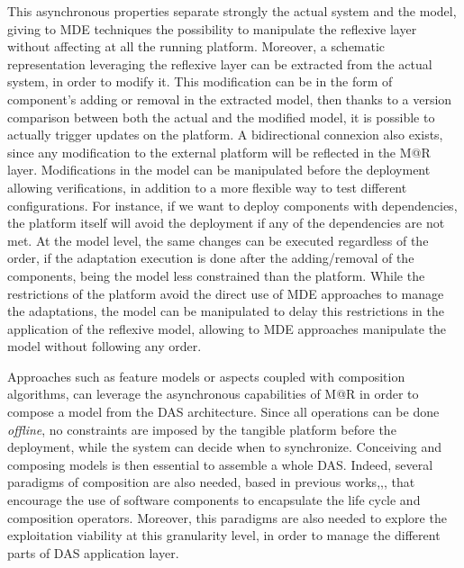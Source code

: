 This asynchronous properties separate strongly the actual system and the model, giving to MDE techniques the possibility to manipulate the reflexive layer without affecting at all the running platform.
Moreover, a schematic representation leveraging the reflexive layer can be extracted from the actual system, in order to modify it.
This modification can be in the form of component's adding or removal in the extracted model, then thanks to a version comparison between both the actual and the modified model, it is possible to actually trigger updates on the platform.
A bidirectional connexion also exists, since any modification to the external platform will be reflected in the M@R layer.
Modifications in the model can be manipulated before the deployment allowing verifications, in addition to a more flexible way to test different configurations.
For instance, if we want to deploy components with dependencies, the platform itself will avoid the deployment if any of the dependencies are not met.
At the model level, the same changes can be executed regardless of the order, if the adaptation execution is done after the adding/removal of the components, being the model less constrained than the platform.
While the restrictions of the platform avoid the direct use of MDE approaches to manage the adaptations, the model can be manipulated to delay this restrictions in the application of the reflexive model, allowing to MDE approaches manipulate the model without following any order.

Approaches such as feature models or aspects\cite{morin2009taming} coupled with composition algorithms, can leverage the asynchronous capabilities of M@R in order to compose a model from the DAS architecture.
Since all operations can be done \textit{offline}, no constraints are imposed by the tangible platform before the deployment, while the system can decide when to synchronize.
Conceiving and composing models is then essential to assemble a whole DAS.
Indeed, several paradigms of composition are also needed, based in previous works\cite{morin2009mar},\cite{ko2012low},\cite{rouvoy2009music}, that encourage the use of software components to encapsulate the life cycle and composition operators.
Moreover, this paradigms are also needed to explore the exploitation viability at this granularity level, in order to manage the different parts of DAS application layer. 


